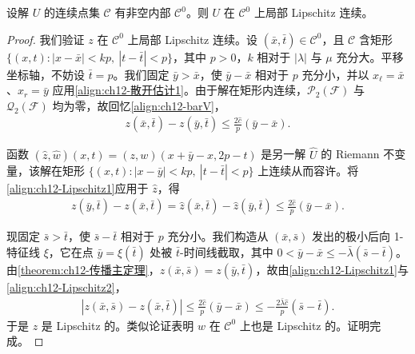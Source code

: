 \documentclass[../../main.tex]{subfiles}
\begin{document}
\begin{theorem}\label{theorem:ch12-局部Lipschitz}
设解 $U$ 的连续点集 $\mathscr{C}$ 有非空内部 $\mathscr{C}^0$。则 $U$ 在 $\mathscr{C}^0$ 上局部 Lipschitz 连续。
\end{theorem}

\begin{proof}
我们验证 $z$ 在 $\mathscr{C}^0$ 上局部 Lipschitz 连续。设 $(\bar x,\bar t)\in\mathscr{C}^0$，且 $\mathscr{C}$ 含矩形 $\{(x,t):|x-\bar x|<kp,\ |t-\bar t|<p\}$，其中 $p>0$，$k$ 相对于 $|\lambda|$ 与 $\mu$ 充分大。平移坐标轴，不妨设 $\bar t=p$。我们固定 $\bar y>\bar x$，使 $\bar y-\bar x$ 相对于 $p$ 充分小，并以 $x_\ell=\bar x$、$x_r=\bar y$ 应用\eqref{align:ch12-散开估计1}。由于解在矩形内连续，$\mathscr{P}_2(\mathscr{F})$ 与 $\mathscr{Q}_2(\mathscr{F})$ 均为零，故回忆\eqref{align:ch12-barV}，
\begin{align}
z(\bar x,\bar t)-z(\bar y,\bar t)\leqslant\frac{2\hat c}{p}(\bar y-\bar x).
\label{align:ch12-Lipschitz1}
\end{align}

函数 $(\hat z,\hat w)(x,t)=(z,w)(x+\bar y-x,2p-t)$ 是另一解 $\hat U$ 的 Riemann 不变量，该解在矩形 $\{(x,t):|x-\bar y|<kp,\ |t-\bar t|<p\}$ 上连续从而容许。将\eqref{align:ch12-Lipschitz1}应用于 $\hat z$，得
\begin{align}
z(\bar y,\bar t)-z(\bar x,\bar t)=\hat z(\bar x,\bar t)-\hat z(\bar y,\bar t)\leqslant\frac{2\hat c}{p}(\bar y-\bar x).
\label{align:ch12-Lipschitz2}
\end{align}

现固定 $\bar s>\bar t$，使 $\bar s-\bar t$ 相对于 $p$ 充分小。我们构造从 $(\bar x,\bar s)$ 发出的极小后向 1-特征线 $\xi$，它在点 $\bar y=\xi(\bar t)$ 处被 $\bar t$-时间线截取，其中 $0<\bar y-\bar x\leqslant-\bar\lambda(\bar s-\bar t)$。由\cref{theorem:ch12-传播主定理}，$z(\bar x,\bar s)=z(\bar y,\bar t)$，故由\eqref{align:ch12-Lipschitz1}与\eqref{align:ch12-Lipschitz2}，
\begin{align}
|z(\bar x,\bar s)-z(\bar x,\bar t)|\leqslant\frac{2\hat c}{p}(\bar y-\bar x)\leqslant-\frac{2\bar\lambda\hat c}{p}(\bar s-\bar t).
\label{align:ch12-Lipschitz3}
\end{align}
于是 $z$ 是 Lipschitz 的。类似论证表明 $w$ 在 $\mathscr{C}^0$ 上也是 Lipschitz 的。证明完成。
\end{proof}
\end{document}

